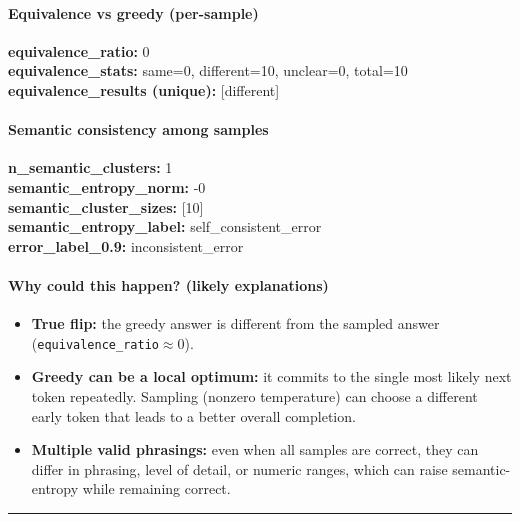\documentclass[11pt]{article}
\newcommand{\mono}[1]{\texttt{#1}}
\begin{document}
\paragraph{Equivalence vs greedy (per-sample)}
\textbf{equivalence\_ratio:} 0\\
\textbf{equivalence\_stats:} same=0, different=10, unclear=0, total=10\\
\textbf{equivalence\_results (unique):} [different]\\
\paragraph{Semantic consistency among samples}
\textbf{n\_semantic\_clusters:} 1\\
\textbf{semantic\_entropy\_norm:} -0\\
\textbf{semantic\_cluster\_sizes:} [10]\\
\textbf{semantic\_entropy\_label:} self\_consistent\_error\\
\textbf{error\_label\_0.9:} inconsistent\_error\\
\paragraph{Why could this happen? (likely explanations)}
\begin{itemize}
\item \textbf{True flip:} the greedy answer is different from the sampled answer (\mono{equivalence\_ratio}$\approx 0$).
\item \textbf{Greedy can be a local optimum:} it commits to the single most likely next token repeatedly. Sampling (nonzero temperature) can choose a different early token that leads to a better overall completion.
\item \textbf{Multiple valid phrasings:} even when all samples are correct, they can differ in phrasing, level of detail, or numeric ranges, which can raise semantic-entropy while remaining correct.
\end{itemize}
\vspace{10pt}
\hrule
\vspace{10pt}
\end{document}

